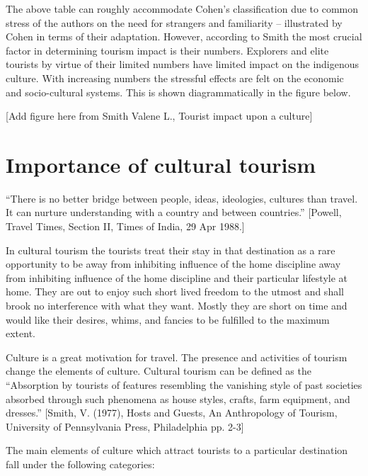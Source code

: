
\noindent The above table can roughly accommodate Cohen's classification due to common stress of the authors on the need for strangers and familiarity -- illustrated by Cohen in terms of their adaptation. However, according to Smith the most crucial factor in determining tourism impact is their numbers. Explorers and elite tourists by virtue of their limited numbers have limited impact on the indigenous culture. With increasing numbers the stressful effects are felt on the economic and socio-cultural systems. This is shown diagrammatically in the figure below.

[Add figure here from Smith Valene L., Tourist impact upon a culture]



\section{Importance of cultural tourism} %
\label{sec:imct}

``There is no better bridge between people, ideas, ideologies, cultures than travel. It can nurture understanding with a country and between countries.'' [Powell, Travel Times, Section II, Times of India, 29 Apr 1988.]

In cultural tourism the tourists treat their stay in that destination as a rare opportunity to be away from inhibiting influence of the home discipline away from inhibiting influence of the home discipline and their particular lifestyle at home. They are out to enjoy such short lived freedom to the utmost and shall brook no interference with what they want. Mostly they are short on time and would like their desires, whims, and fancies to be fulfilled to the maximum extent.

Culture is a great motivation for travel. The presence and activities of tourism change the elements of culture. Cultural tourism can be defined as the ``Absorption by tourists of features resembling the vanishing style of past societies absorbed through such phenomena as house styles, crafts, farm equipment, and dresses.'' [Smith, V. (1977), Hosts and Guests, An Anthropology of Tourism, University of Pennsylvania Press, Philadelphia pp. 2-3]

The main elements of culture which attract tourists to a particular destination fall under the following categories:

